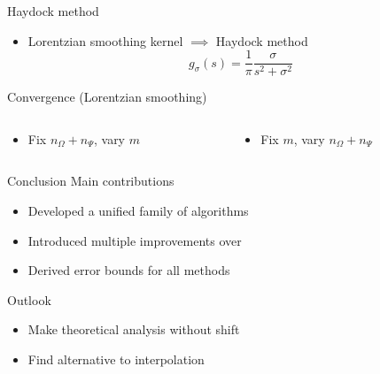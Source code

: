 \documentclass[aspectratio=169, leqno, 12pt]{beamer}
\begin{document}
\begin{frame}{Haydock method}
    \begin{itemize}
        \item Lorentzian smoothing kernel $\implies$ Haydock method \cite{lin2016review}
    \begin{equation}
        g_{\sigma}(s) = \frac{1}{\pi} \frac{\sigma}{s^2 + \sigma^2}
    \end{equation}
    \end{itemize}
    \centering
    
\end{frame}
 
\begin{frame}{Convergence (Lorentzian smoothing)}
    \begin{columns}
        \begin{column}{0.5\textwidth}
            \begin{itemize}
                \item Fix $n_{\Omega} + n_{\Psi}$, vary $m$
            \end{itemize}
            \scalebox{1.0}{}
        \end{column}
        \begin{column}{0.5\textwidth}
            \begin{itemize}
                \item Fix $m$, vary $n_{\Omega} + n_{\Psi}$
            \end{itemize}
            \scalebox{1.0}{}
        \end{column}
    \end{columns}
\end{frame}

\begin{frame}{Conclusion}
    Main contributions
    \begin{itemize}
        \item Developed a unified family of algorithms 
        \item Introduced multiple improvements over \cite{lin2017randomized}
        \item Derived error bounds for all methods
    \end{itemize}
    Outlook
    \begin{itemize}
        \item Make theoretical analysis without shift
        \item Find alternative to interpolation
    \end{itemize}
\end{frame}
\end{document}

